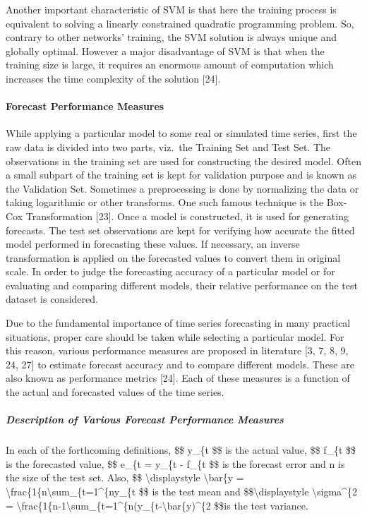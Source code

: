 \documentclass[
  letterpaper,
  DIV=11,
  numbers=noendperiod]{scrartcl}
\let\oldparagraph\paragraph
\renewcommand{\paragraph}[1]{\oldparagraph{#1}\mbox{}}
\let\oldsubparagraph\subparagraph
\renewcommand{\subparagraph}[1]{\oldsubparagraph{#1}\mbox{}}
\begin{document}
Another important characteristic of SVM is that here the training
process is equivalent to solving a linearly constrained quadratic
programming problem. So, contrary to other networks' training, the SVM
solution is always unique and globally optimal. However a major
disadvantage of SVM is that when the training size is large, it requires
an enormous amount of computation which increases the time complexity of
the solution {[}24{]}.

\hypertarget{forecast-performance-measures}{%
\paragraph{Forecast Performance
Measures}\label{forecast-performance-measures}}

While applying a particular model to some real or simulated time series,
first the raw data is divided into two parts, viz.~the Training Set and
Test Set. The observations in the training set are used for constructing
the desired model. Often a small subpart of the training set is kept for
validation purpose and is known as the Validation Set. Sometimes a
preprocessing is done by normalizing the data or taking logarithmic or
other transforms. One such famous technique is the Box-Cox
Transformation {[}23{]}. Once a model is constructed, it is used for
generating forecasts. The test set observations are kept for verifying
how accurate the fitted model performed in forecasting these values. If
necessary, an inverse transformation is applied on the forecasted values
to convert them in original scale. In order to judge the forecasting
accuracy of a particular model or for evaluating and comparing different
models, their relative performance on the test dataset is considered.

Due to the fundamental importance of time series forecasting in many
practical situations, proper care should be taken while selecting a
particular model. For this reason, various performance measures are
proposed in literature {[}3, 7, 8, 9, 24, 27{]} to estimate forecast
accuracy and to compare different models. These are also known as
performance metrics {[}24{]}. Each of these measures is a function of
the actual and forecasted values of the time series.

\hypertarget{description-of-various-forecast-performance-measures}{%
\subparagraph{Description of Various Forecast Performance
Measures}\label{description-of-various-forecast-performance-measures}}

In each of the forthcoming definitions, \$\$ y\_\{t \$\$ is the actual
value, \$\$ f\_\{t \$\$ is the forecasted value, \$\$ e\_\{t = y\_\{t -
f\_\{t \$\$ is the forecast error and n is the size of the test set.
Also, \$\$ \textbackslash displaystyle \textbackslash bar\{y =
\textbackslash frac\{1\{n\textbackslash sum\_\{t=1\^{}\{ny\_\{t \$\$ is
the test mean and \$\$\textbackslash displaystyle
\textbackslash sigma\^{}\{2 =
\textbackslash frac\{1\{n-1\textbackslash sum\_\{t=1\^{}\{n(y\_\{t-\textbackslash bar\{y)\^{}\{2
\$\$is the test variance.
\end{document}
